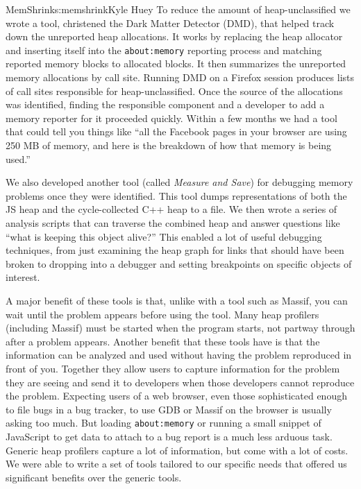 \begin{aosachapter}{MemShrink}{s:memshrink}{Kyle Huey}
To reduce the amount of heap-unclassified we wrote a tool, christened
the Dark Matter Detector (DMD), that helped track down the unreported
heap allocations. It works by replacing the heap allocator and inserting
itself into the \texttt{about:memory} reporting process and matching
reported memory blocks to allocated blocks. It then summarizes the
unreported memory allocations by call site. Running DMD on a Firefox
session produces lists of call sites responsible for heap-unclassified.
Once the source of the allocations was identified, finding the
responsible component and a developer to add a memory reporter for it
proceeded quickly. Within a few months we had a tool that could tell you
things like ``all the Facebook pages in your browser are using 250 MB of
memory, and here is the breakdown of how that memory is being used.''

We also developed another tool (called \emph{Measure and Save}) for
debugging memory problems once they were identified. This tool dumps
representations of both the JS heap and the cycle-collected C++ heap to
a file. We then wrote a series of analysis scripts that can traverse the
combined heap and answer questions like ``what is keeping this object
alive?'' This enabled a lot of useful debugging techniques, from just
examining the heap graph for links that should have been broken to
dropping into a debugger and setting breakpoints on specific objects of
interest.

A major benefit of these tools is that, unlike with a tool such as
Massif, you can wait until the problem appears before using the tool.
Many heap profilers (including Massif) must be started when the program
starts, not partway through after a problem appears. Another benefit
that these tools have is that the information can be analyzed and used
without having the problem reproduced in front of you. Together they
allow users to capture information for the problem they are seeing and
send it to developers when those developers cannot reproduce the
problem. Expecting users of a web browser, even those sophisticated
enough to file bugs in a bug tracker, to use GDB or Massif on the
browser is usually asking too much. But loading \texttt{about:memory} or
running a small snippet of JavaScript to get data to attach to a bug
report is a much less arduous task. Generic heap profilers capture a lot
of information, but come with a lot of costs. We were able to write a
set of tools tailored to our specific needs that offered us significant
benefits over the generic tools.


\end{aosachapter}
